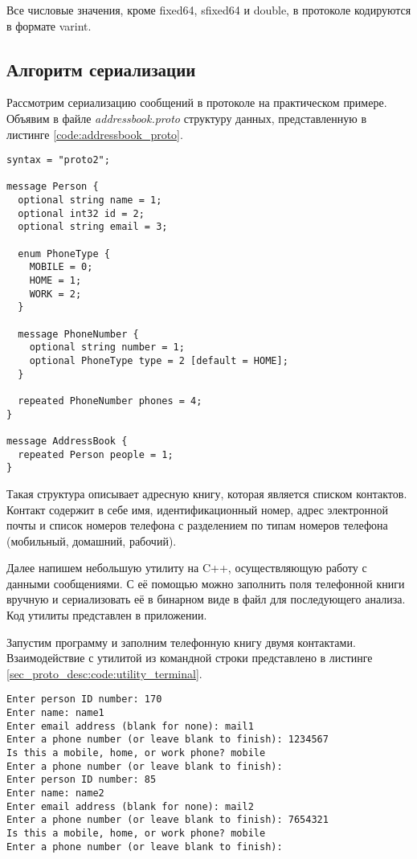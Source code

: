 Все числовые значения, кроме fixed64, sfixed64 и double, в протоколе кодируются в формате varint.

\subsection{Алгоритм сериализации}

Рассмотрим сериализацию сообщений в протоколе на практическом примере. Объявим в файле \textit{addressbook.proto} 
структуру данных, представленную в листинге \ref{code:addressbook_proto}.

\noindent\begin{minipage}{\linewidth}
\begin{lstlisting}[style=CodeListing, label=code:addressbook_proto, caption={Protobuf-сообщения AddressBook и Person}]
syntax = "proto2";

message Person {
  optional string name = 1;
  optional int32 id = 2;
  optional string email = 3;

  enum PhoneType {
    MOBILE = 0;
    HOME = 1;
    WORK = 2;
  }

  message PhoneNumber {
    optional string number = 1;
    optional PhoneType type = 2 [default = HOME];
  }

  repeated PhoneNumber phones = 4;
}

message AddressBook {
  repeated Person people = 1;
}
\end{lstlisting}
\end{minipage}

Такая структура описывает адресную книгу, которая является списком контактов.
Контакт содержит в себе имя, идентификационный номер, адрес электронной почты и список номеров
телефона с разделением по типам номеров телефона (мобильный, домашний, рабочий).

Далее напишем небольшую утилиту на C++, осуществляющую работу с данными сообщениями. С её помощью можно заполнить поля телефонной книги вручную и сериализовать её в бинарном виде в файл для последующего анализа. Код утилиты представлен в приложении. %

Запустим программу и заполним телефонную книгу двумя контактами. Взаимодействие с утилитой из командной строки представлено в листинге \ref{sec_proto_desc:code:utility_terminal}.

\noindent\begin{minipage}{\linewidth}
\begin{lstlisting}[style=CodeListing, caption={Взаимодействие с утилитой для заполнения и сериализации сообщений}, label=sec_proto_desc:code:utility_terminal]
Enter person ID number: 170
Enter name: name1
Enter email address (blank for none): mail1
Enter a phone number (or leave blank to finish): 1234567
Is this a mobile, home, or work phone? mobile
Enter a phone number (or leave blank to finish):
Enter person ID number: 85
Enter name: name2
Enter email address (blank for none): mail2
Enter a phone number (or leave blank to finish): 7654321
Is this a mobile, home, or work phone? mobile
Enter a phone number (or leave blank to finish):
\end{lstlisting}
\end{minipage}

